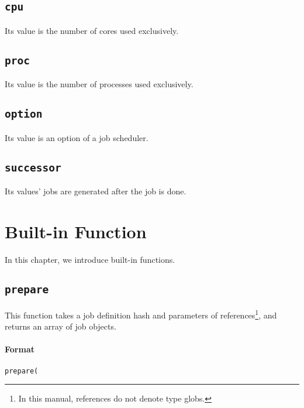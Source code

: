 \documentclass[a4paper,10pt]{report}
\begin{document}
\section{\texttt{cpu}}

Its value is the number of cores used exclusively.

\section{\texttt{proc}}

Its value is the number of processes used exclusively.

\section{\texttt{option}}

Its value is an option of a job scheduler.

\section{\texttt{successor}}

Its values' jobs are generated after the job is done.
\fi

\chapter{Built-in Function}\label{chapfun}

In this chapter, we introduce built-in functions.

\def\format{Format}
\def\example{Example}
\def\advanced{Advanced}

\section{\texttt{prepare}}\label{sec:prepare}

This function takes a job definition hash and parameters of
references\footnote{In this manual, references do not denote type
globs.}, and returns an array of job objects.


\subsubsection{\format}

\begin{boxnote}
\begin{alltt}
prepare(%template);
\end{alltt}
\end{boxnote}
\vspace{\baselineskip}
\end{document}
